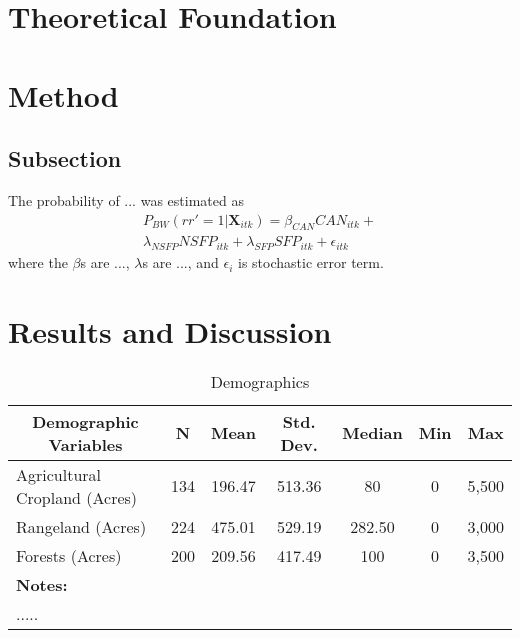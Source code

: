 \documentclass[12pt, a4paper]{article}
\begin{document}
\section{Theoretical Foundation}

\section{Method}
\subsection{Subsection}

\noindent The probability of ... was estimated as
\begin{multline}\label{Prob}
P_{BW}(rr' = 1|\textbf{X}_{itk}) = \beta_{{CAN}}{{CAN}_{itk}} +  \\ \lambda_{{NSFP}}{{NSFP}_{itk}} +
\lambda_{{SFP}}{{SFP}_{itk}} + \epsilon_{{itk}}
\end{multline}
\noindent where the $\beta$s are ..., $\lambda$s are ..., and $\epsilon_{i}$ is stochastic error term.

\section{Results and Discussion}

\begin{longtable}[c]{rcccccc}
\caption{Demographics}
\label{tab:Demog} \\
\toprule
\multicolumn{1}{c}{\textbf{Demographic Variables}} & \textbf{N} & \textbf{Mean} & \textbf{Std. Dev.} & \textbf{Median} & \textbf{Min} & \textbf{Max} \\
\midrule
\multicolumn{1}{l}{Agricultural Cropland (Acres)}       & 134 & 196.47 & 513.36 & 80 & 0 & 5,500 \\
\multicolumn{1}{l}{Rangeland (Acres)}                   & 224 & 475.01 & 529.19 & 282.50 & 0 & 3,000 \\
\multicolumn{1}{l}{Forests (Acres)}                     & 200 & 209.56 & 417.49 & 100 & 0 & 3,500\\
\bottomrule
\multicolumn{7}{l}{\textbf{Notes:}}\\
\multicolumn{7}{l}{.....} \\
\end{longtable}
\end{document}
